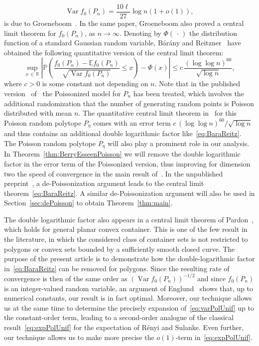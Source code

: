 \documentclass[10pt]{amsart}
\theoremstyle{definition}\newtheorem{defi}[theo]{Definition}\newtheorem{rema}[theo]{Remark}\newtheorem{exam}[theo]{Example}\newtheorem{exem}[theo]{Example}\newtheorem{nota}[theo]{Notation}
\newcommand{\var}{\operatorname{Var}}
\newcommand{\bbR}{\mathbb{R}}
\newcommand{\bbE}{\mathbb{E}}
\newcommand{\bbP}{\mathbb{P}}
\begin{document}
\begin{equation}\label{eq:varPolUnif}
\var f_0(P_n)=\frac{10\ell}{27}\log n (1+o(1)),
\end{equation}
is due to Groeneboom~\cite{Gro88}. In the same paper, Groeneboom also proved a central limit theorem for $f_0(P_n)$, as $n\to\infty$. Denoting by $\Phi(\,\cdot\,)$ the distribution function of a standard Gaussian random variable, Bárány and Reitzner~\cite{BR06} have obtained the following quantitative version of the central limit theorem:
\begin{equation}\label{eq:BaraReitz}
\sup_{x\,\in\,\bbR}\left|\bbP\left(\frac{f_0(P_n)-\bbE f_0(P_n)}{\sqrt{\var f_0(P_n)}}\leq x\right)-\Phi(x)\right|\leq c\,\frac{(\log\log n)^{60}}{\sqrt{\log n}},
\end{equation}
where $c>0$ is some constant not depending on $n$. Note that in the published version~\cite{BR10} of~\cite{BR06} the Poissonized model for $P_n$ has been treated, which involves the additional randomization that the number of generating random points is Poisson distributed with mean $n$. The quantitative central limit theorem in~\cite{BR10} for this Poisson random polytope $P_\eta$ comes with an error term $c\, (\log\log n)^{60}/ \sqrt{\log n} $ and thus contains an additional double logarithmic factor like~\eqref{eq:BaraReitz}. The Poisson random polytope $P_\eta$ will also play a prominent role in our analysis. In Theorem~\ref{thm:BerryEsseenPoisson} we will remove the double logarithmic factor in the error term of the Poissonized version, thus improving for dimension two the speed of convergence in the main result of~\cite{BR10}. In the unpublished preprint~\cite{BR06}, a de-Poissonization argument leads to the central limit theorem~\eqref{eq:BaraReitz}. A similar de-Poissonization argument will also be used in Section~\ref{sec:dePoisson} to obtain Theorem~\ref{thm:main}.

The double logarithmic factor also appears in a central limit theorem of Pardon~\cite{Pardon1, Pardon2}, which holds for general planar convex container. This is one of the few result in the literature, in which the considered class of container sets is not restricted to polygons or convex sets bounded by a sufficiently smooth closed curve. The purpose of the present article is to demonstrate how the double-logarithmic factor in~\eqref{eq:BaraReitz} can be removed for polygons. Since the resulting rate of convergence is then of the same order as $(\var f_0(P_n))^{-1/2}$ and since $f_0(P_n)$ is an integer-valued random variable, an argument of Englund~\cite[Section~6]{Englund} shows that, up to numerical constants, our result is in fact optimal. Moreover, our technique allows us at the same time to determine the precisely expansion of~\eqref{eq:varPolUnif} up to the constant-order term, leading to a second-order analogue of the classical result~\eqref{eq:expPolUnif} for the expectation of Rényi and Sulanke. Even further, our technique allows us to make more precise the $o(1)$-term in~\eqref{eq:expPolUnif}.
\end{document}
